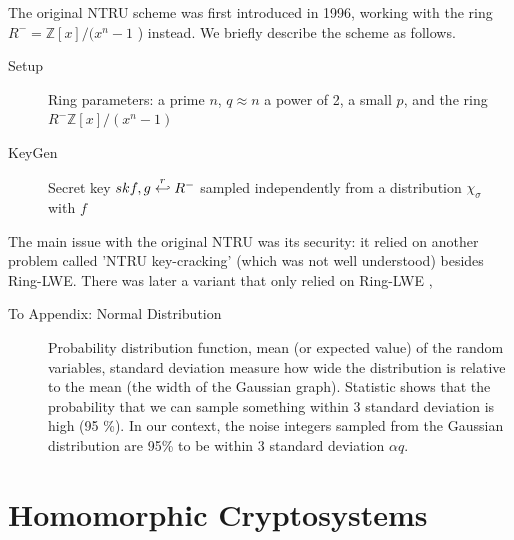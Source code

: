 \begin{description}
\begin{description}
\begin{description}
                    The original NTRU scheme was first introduced in 1996, working with the ring \(R^{-} =
                    \mathbb{Z}[x]/(x^{n} -1 \)
                    ) instead. We briefly describe the scheme as follows.
                    \begin{description}
                    \item[Setup] Ring parameters: a prime \(n\), \(q \approx n\) a power of 2, a small \(p\), and the
                      ring \(R^{-}\mathbb{Z}[x]/(x^{n} -1 )\)
                    \item[KeyGen] Secret key \(sk f, g\stackrel{r}{\hookleftarrow}
                      R^{-} \) sampled independently from a
                      distribution \(\chi_{\sigma}\) with \(f\)
                    \end{description}

                    The
                    main issue with the original NTRU was its security: it
                    relied on another problem called 'NTRU key-cracking' (which
                        was not
                    well understood) besides
                    Ring-LWE. There was later a variant that only relied on
                    Ring-LWE \cite{stehle2011making},

            \end{description}

            \end{description}

    \end{description}

    \begin{description}
        \item[To Appendix: Normal Distribution] Probability distribution
            function, mean (or expected value) of the random variables,
            standard deviation measure how wide the distribution is
            relative to the mean (the width of the Gaussian graph). Statistic
            shows that the probability that we can sample something within 3
            standard deviation is high (95 \%). In our context, the noise
            integers sampled from the Gaussian distribution are 95\% to be
            within 3 standard deviation $\alpha q$.
    \end{description}


\section{Homomorphic Cryptosystems}
\label{sec:defHomo}

